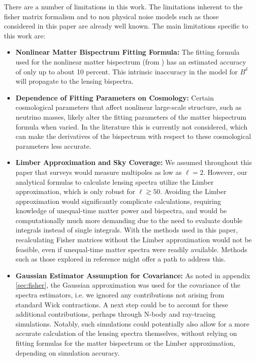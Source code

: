 \documentclass[11pt]{article} %
\begin{document}
There are a number of limitations in this work. The limitations inherent to the fisher matrix formalism and to non physical noise models such as those considered in this paper are already well known. The main limitations specific to this work are:
\begin{itemize}
     \item \textbf{Nonlinear Matter Bispectrum Fitting Formula:} The fitting formula used for the nonlinear matter bispectrum (from \cite{bispfit}) has an estimated accuracy of only up to about 10 percent. This intrinsic inaccuracy in the model for $B^{\delta}$ will propagate to the lensing bispectra.
     \item \textbf{Dependence of Fitting Parameters on Cosmology:} Certain cosmological parameters that affect nonlinear large-scale structure, such as neutrino masses, likely alter the fitting parameters of the matter bispectrum formula when varied. In the literature this is currently not considered, which can make the derivatives of the bispectrum with respect to these cosmological parameters less accurate.
     \item \textbf{Limber Approximation and Sky Coverage:} We assumed throughout this paper that surveys would measure multipoles as low as $\ell = 2$.  However, our analytical formulas to calculate lensing spectra utilize the Limber approximation, which is only robust for $\ell \gtrsim 50$. Avoiding the Limber approximation would significantly complicate calculations, requiring knowledge of unequal-time matter power and bispectra, and would be computationally much more demanding due to the need to evaluate double integrals instead of single integrals. With the methods used in this paper, recalculating Fisher matrices without the Limber approximation would not be feasible, even if unequal-time matter spectra were readily available. Methods such as those explored in reference \cite{Chen:2021vba} might offer a path to address this.

     \item \textbf{Gaussian Estimator Assumption for Covariance:} As noted in appendix \ref{sec:fisher}, the Gaussian approximation was used for the covariance of the spectra estimators, i.e. we ignored any contributions not arising from standard Wick contractions. A next step could be to account for these additional contributions, perhaps through N-body and ray-tracing simulations. Notably, such simulations could potentially also allow for a more accurate calculation of the lensing spectra themselves, without relying on fitting formulas for the matter bispectrum or the Limber approximation, depending on simulation accuracy. 


\end{itemize}
\end{document}
